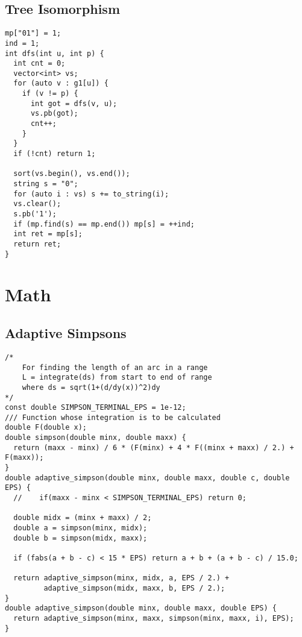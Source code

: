 \documentclass[FSZ,a4paper,onesided]{article}
\begin{document}
\begin{multicols*}{\COLS}
\subsection{Tree Isomorphism}
\begin{lstlisting}
mp["01"] = 1;
ind = 1;
int dfs(int u, int p) {
  int cnt = 0;
  vector<int> vs;
  for (auto v : g1[u]) {
    if (v != p) {
      int got = dfs(v, u);
      vs.pb(got);
      cnt++;
    }
  }
  if (!cnt) return 1;

  sort(vs.begin(), vs.end());
  string s = "0";
  for (auto i : vs) s += to_string(i);
  vs.clear();
  s.pb('1');
  if (mp.find(s) == mp.end()) mp[s] = ++ind;
  int ret = mp[s];
  return ret;
}
\end{lstlisting}
\section{Math}
\subsection{Adaptive Simpsons}
\begin{lstlisting}
/*
    For finding the length of an arc in a range
    L = integrate(ds) from start to end of range
    where ds = sqrt(1+(d/dy(x))^2)dy
*/
const double SIMPSON_TERMINAL_EPS = 1e-12;
/// Function whose integration is to be calculated
double F(double x);
double simpson(double minx, double maxx) {
  return (maxx - minx) / 6 * (F(minx) + 4 * F((minx + maxx) / 2.) + F(maxx));
}
double adaptive_simpson(double minx, double maxx, double c, double EPS) {
  //    if(maxx - minx < SIMPSON_TERMINAL_EPS) return 0;

  double midx = (minx + maxx) / 2;
  double a = simpson(minx, midx);
  double b = simpson(midx, maxx);

  if (fabs(a + b - c) < 15 * EPS) return a + b + (a + b - c) / 15.0;

  return adaptive_simpson(minx, midx, a, EPS / 2.) +
         adaptive_simpson(midx, maxx, b, EPS / 2.);
}
double adaptive_simpson(double minx, double maxx, double EPS) {
  return adaptive_simpson(minx, maxx, simpson(minx, maxx, i), EPS);
}

\end{lstlisting}

\end{multicols*}
\end{document}
